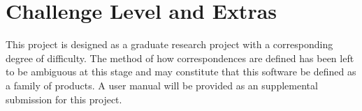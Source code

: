 \documentclass{article}
\begin{document}
\section{Challenge Level and Extras}
This project is designed as a graduate research project with a corresponding 
degree of difficulty. The method of how correspondences are defined has been 
left to be ambiguous at this stage and may constitute that this software be 
defined as a family of products.
\newline
\newline
A user manual will be provided as an supplemental submission for this project.
\end{document}
